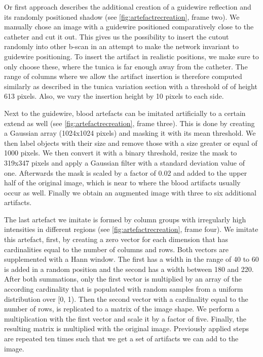 Or first approach describes the additional creation of a guidewire reflection and its randomly positioned shadow (see \cref{fig:artefactrecreation}, frame two). We manually chose an image with a guidewire positioned comparatively close to the catheter and cut it out. This gives us the possibility to insert the cutout randomly into other \Gls{b-scan} in an attempt to make the network invariant to guidewire positioning. To insert the artifact in realistic positions, we make sure to only choose these, where the tunica is far enough away from the catheter. The range of columns where we allow the artifact insertion is therefore computed similarly as described in the tunica variation section with a threshold of of height 613 pixels. Also, we vary the insertion height by 10 pixels to each side.

Next to the guidewire, blood artefacts can be imitated artificially to a certain extend as well (see \cref{fig:artefactrecreation}, frame three). This is done by creating a Gaussian array (1024x1024 pixels) and masking it with its mean threshold. We then label objects with their size and remove those with a size greater or equal of 1000 pixels. We then convert it with a binary threshold, resize the mask to 319x347 pixels and apply a Gaussian filter with a standard deviation value of one. Afterwards the mask is scaled by a factor of 0.02 and added to the upper half of the original image, which is near to where the blood artifacts usually occur as well. Finally we obtain an augmented image with three to six additional artifacts.

The last artefact we imitate is formed by column groups with irregularly high intensities in different regions (see \cref{fig:artefactrecreation}, frame four). We imitate this artefact, first, by creating a zero vector for each dimension that has cardinalities equal to the number of columns and rows. Both vectors are supplemented with a Hann window. The first has a width in the range of 40 to 60 is added in a random position and the second has a width between 180 and 220. After both summations, only the first vector is multiplied by an array of the according cardinality that is populated with random samples from a uniform distribution over [0, 1). Then the second vector with a cardinality equal to the number of rows, is replicated to a matrix of the image shape. We perform a multiplication with the first vector and scale it by a factor of five. Finally, the resulting matrix is multiplied with the original image. Previously applied steps are repeated ten times such that we get a set of artifacts we can add to the image.

